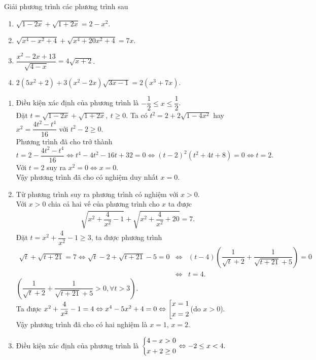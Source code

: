 \begin{bt}
	Giải phương trình các phương trình sau
	\begin{enumerate}
		\item $\sqrt{1-2x} + \sqrt{1+2x} = 2-x^2 $.
		\item $\sqrt{x^4-x^2+4}+\sqrt{x^4+20x^2+4}=7x$.
		\item $\dfrac{x^2 - 2x + 13}{\sqrt{4-x}} = 4\sqrt{x + 2}$.
		\item $2\left( 5x^2+2\right) +3 \left( x^2 -2x\right) \sqrt{3x-1} =2 \left( x^3 +7x\right)$.
	\end{enumerate} 	
	\loigiai
	{
		\begin{enumerate}
			\item Điều kiện xác định của phương trình là $ -\dfrac{1}{2}\le x\le \dfrac{1}{2} $.\\
			Đặt $ t = \sqrt{1-2x} + \sqrt{1+2x},\ t\ge 0 $. Ta có $ t^2 = 2+2\sqrt{1-4x^2}$ hay $x^2 = \dfrac{4t^2-t^4}{16}$ với $ t^2-2\ge 0 $.\\
			Phương trình đã cho trở thành
			\[ t = 2-\dfrac{4t^2-t^4}{16} \Leftrightarrow t^4-4t^2-16t+32 = 0\Leftrightarrow (t-2)^2(t^2+4t+8) = 0\Leftrightarrow t = 2. \]
			Với $ t = 2 $ suy ra $ x^2 = 0 \Leftrightarrow x= 0 $.\\
			Vậy phương trình đã cho có nghiệm duy nhất $x=0$.
			\item 	Từ phương trình suy ra phương trình có nghiệm với $x>0$.\\
			Với $x>0$ chia cả hai vế của phương trình cho $x$ ta được
			\begin{eqnarray*}
				\sqrt{x^2+\dfrac{4}{x^2}-1}+\sqrt{x^2+\dfrac{4}{x^2}+20}=7.
			\end{eqnarray*}
			Đặt $t=x^2+\dfrac{4}{x^2}-1\ge 3$, ta được phương trình
			\begin{eqnarray*}
				\sqrt{t}+\sqrt{t+21}=7\Leftrightarrow \sqrt{t}-2+\sqrt{t+21}-5=0&\Leftrightarrow &(t-4)\left(\dfrac{1}{\sqrt{t}+2}+\dfrac{1}{\sqrt{t+21}+5}\right)=0\\&\Leftrightarrow &t=4.
			\end{eqnarray*}
		    $\left(\dfrac{1}{\sqrt{t}+2} + \dfrac{1}{\sqrt{t+21}+5} > 0, \forall t>3\right)$.\\
			Ta được $x^2+\dfrac{4}{x^2}-1=4\Leftrightarrow x^4-5x^2+4=0\Leftrightarrow\left[\begin{aligned}&x=1\\&x=2\end{aligned}\right.$(do $x>0$).\\
			Vậy phương trình đã cho có hai nghiệm là $x=1$, $x=2$.
			\item Điều kiện xác định của phương trình là $\left\{\begin{aligned}&4 - x > 0\\&x + 2 \geq 0\end{aligned}\right. \Leftrightarrow -2 \leq x < 4.$\\

\end{enumerate}}
\end{bt}
